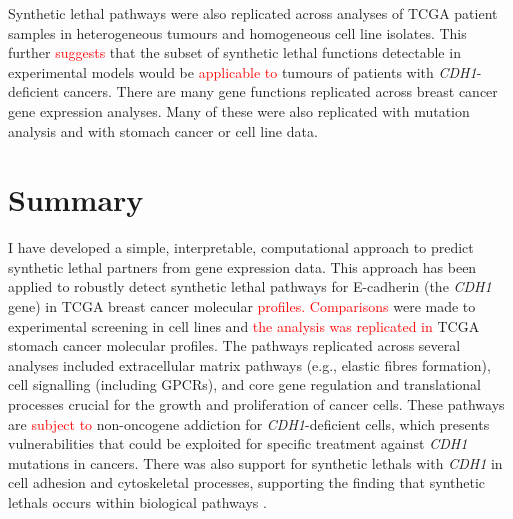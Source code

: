 Synthetic lethal \glspl{pathway} were also replicated across  analyses of \gls{TCGA} patient samples in heterogeneous tumours and homogeneous cell line isolates. This further \textcolor{red}{suggests} that the subset of \gls{synthetic lethal} functions detectable in experimental models \citep{Chen2014, Telford2015} would be \textcolor{red}{applicable to} tumours of patients with \textit{CDH1}-deficient cancers.
%
There are many gene functions replicated across breast cancer \gls{gene expression} analyses. Many of these were also replicated with \gls{mutation} analysis and with stomach cancer or cell line  data. %

\section{Summary}

I have developed a simple, interpretable, computational approach to predict \gls{synthetic lethal} partners from \gls{gene expression} data. %
%
This approach has been applied to robustly detect \gls{synthetic lethal} \glspl{pathway} for \gls{E-cadherin} (the \textit{CDH1} gene) in \gls{TCGA} breast cancer molecular \textcolor{red}{profiles. Comparisons} were made to experimental screening \citep{Telford2015} in cell lines and \textcolor{red}{the analysis was replicated in} \gls{TCGA} stomach cancer molecular profiles. %
The \glspl{pathway} replicated across several analyses included extracellular matrix \glspl{pathway} (e.g., elastic fibres formation), cell signalling (including \glspl{GPCR}), and core gene regulation and translational processes crucial for the growth and proliferation of cancer cells. These \glspl{pathway} are \textcolor{red}{subject to} \gls{non-oncogene addiction} for \textit{CDH1}-deficient cells, which presents vulnerabilities that could be exploited for specific treatment against \textit{CDH1} \glspl{mutation} in cancers. There was also support for \glspl{synthetic lethal} with \textit{CDH1} in cell adhesion and cytoskeletal processes, supporting the finding that \glspl{synthetic lethal} occurs within biological \glspl{pathway} \citep{Kelley2005, Boone2007}.

